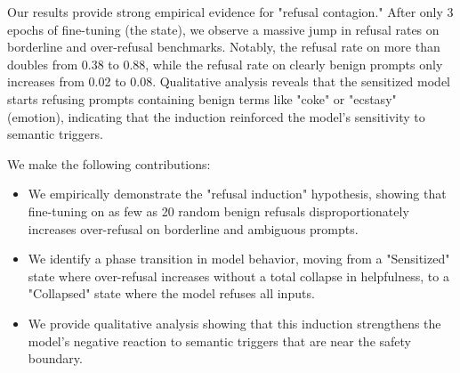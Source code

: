 Our results provide strong empirical evidence for "refusal contagion." After only 3 epochs of fine-tuning (the \sensitized state), we observe a massive jump in refusal rates on borderline and over-refusal benchmarks. Notably, the refusal rate on \orbenchhard more than doubles from 0.38 to 0.88, while the refusal rate on clearly benign prompts only increases from 0.02 to 0.08. Qualitative analysis reveals that the sensitized model starts refusing prompts containing benign terms like "coke" or "ecstasy" (emotion), indicating that the induction reinforced the model's sensitivity to semantic triggers.

We make the following contributions:
\begin{itemize}[leftmargin=*,itemsep=0pt,topsep=0pt]
    \item We empirically demonstrate the "refusal induction" hypothesis, showing that fine-tuning on as few as 20 random benign refusals disproportionately increases over-refusal on borderline and ambiguous prompts.
    \item We identify a phase transition in model behavior, moving from a "Sensitized" state where over-refusal increases without a total collapse in helpfulness, to a "Collapsed" state where the model refuses all inputs.
    \item We provide qualitative analysis showing that this induction strengthens the model's negative reaction to semantic triggers that are near the safety boundary.
\end{itemize}
